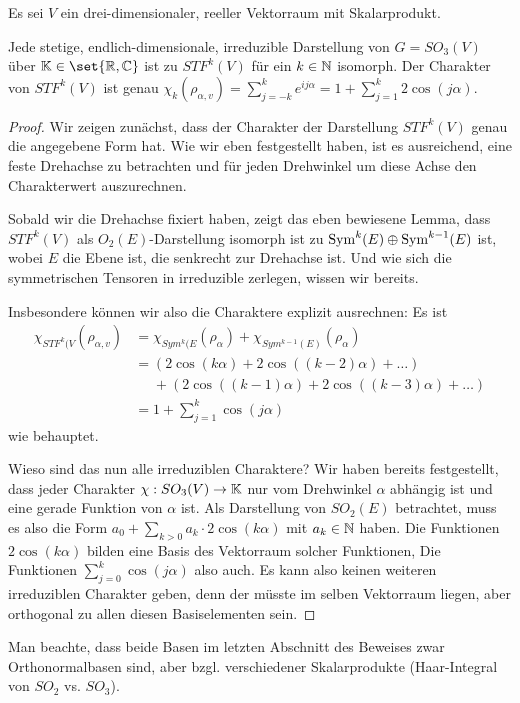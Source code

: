 \begin{theorem}
Es sei $V$ ein drei-dimensionaler, reeller Vektorraum mit Skalarprodukt.

Jede stetige, endlich-dimensionale, irreduzible Darstellung von $G=SO_3(V)$ über $\IK\in\set{\IR,\IC}$ ist zu $STF^k(V)$ für ein $k\in\mathbb{N}$ isomorph. Der Charakter von $STF^k(V)$ ist genau $\chi_k(\rho_{\alpha,v}) = \sum_{j=-k}^k e^{ij\alpha} = 1+\sum_{j=1}^k 2\cos(j\alpha)$. 
\end{theorem}
\begin{proof}
Wir zeigen zunächst, dass der Charakter der Darstellung $STF^k(V)$ genau die angegebene Form hat. Wie wir eben festgestellt haben, ist es ausreichend, eine feste Drehachse zu betrachten und für jeden Drehwinkel um diese Achse den Charakterwert auszurechnen.

Sobald wir die Drehachse fixiert haben, zeigt das eben bewiesene Lemma, dass $STF^k(V)$ als $O_2(E)$-Darstellung isomorph ist zu $\operatorname{Sym}^k(E)\oplus \operatorname{Sym}^{k-1}(E)$ ist, wobei $E$ die Ebene ist, die senkrecht zur Drehachse ist. Und wie sich die symmetrischen Tensoren in irreduzible zerlegen, wissen wir bereits.

Insbesondere können wir also die Charaktere explizit ausrechnen: Es ist
\begin{align*}
    \chi_{STF^k(V}(\rho_{\alpha,v}) &= \chi_{Sym^k(E}(\rho_\alpha) + \chi_{Sym^{k-1}(E)}(\rho_\alpha) \\
    &= (2\cos(k\alpha)+2\cos((k-2)\alpha)+\ldots) \\ &\phantom{=}+(2\cos((k-1)\alpha)+2\cos((k-3)\alpha) +\ldots) \\
    &= 1+\sum_{j=1}^k \cos(j\alpha)
\end{align*}
wie behauptet.

\medbreak
Wieso sind das nun alle irreduziblen Charaktere? Wir haben bereits festgestellt, dass jeder Charakter $\chi: SO_3(V)\to\mathbb{K}$ nur vom Drehwinkel $\alpha$ abhängig ist und eine gerade Funktion von $\alpha$ ist. Als Darstellung von $SO_2(E)$ betrachtet, muss es also die Form $a_0 + \sum_{k>0} a_k\cdot 2\cos(k\alpha)$ mit $a_k\in\mathbb{N}$ haben. Die Funktionen $2\cos(k\alpha)$ bilden eine Basis des Vektorraum solcher Funktionen, Die Funktionen $\sum_{j=0}^k \cos(j\alpha)$ also auch. Es kann also keinen weiteren irreduziblen Charakter geben, denn der müsste im selben Vektorraum liegen, aber orthogonal zu allen diesen Basiselementen sein.
\end{proof}

\begin{remark}
Man beachte, dass beide Basen im letzten Abschnitt des Beweises zwar Orthonormalbasen sind, aber bzgl. verschiedener Skalarprodukte (Haar-Integral von $SO_2$ vs. $SO_3$).
\end{remark}


